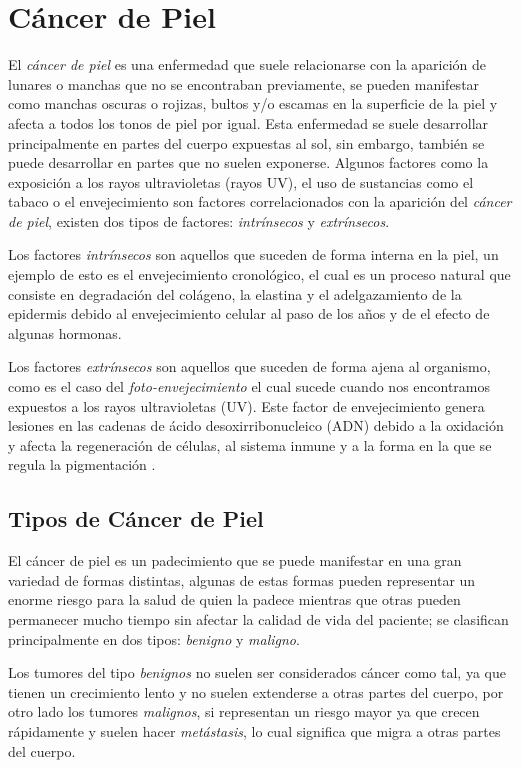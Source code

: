 \section{Cáncer de Piel}
El \emph{cáncer de piel} es una enfermedad que suele relacionarse con la aparición de lunares o manchas que no se encontraban previamente, se pueden manifestar como manchas oscuras o rojizas, bultos y/o escamas en la superficie de la piel y afecta a todos los tonos de piel por igual. Esta enfermedad se suele desarrollar principalmente en partes del cuerpo expuestas al sol, sin embargo, también se puede desarrollar en partes que no suelen exponerse. Algunos factores como la exposición a los rayos ultravioletas (rayos UV), el uso de sustancias como el tabaco o el envejecimiento son factores correlacionados con la aparición del \emph{cáncer de piel}, existen dos tipos de factores: \emph{intrínsecos} y \emph{extrínsecos}.

Los factores \emph{intrínsecos} son aquellos que suceden de forma interna en la piel, un ejemplo de esto es el envejecimiento cronológico, el cual es un proceso natural que consiste en degradación del colágeno, la elastina y el adelgazamiento de la epidermis debido al envejecimiento celular al paso de los años y de el efecto de algunas hormonas.
\bigskip

Los factores \emph{extrínsecos} son aquellos que suceden de forma ajena al organismo, como es el caso del \emph{foto-envejecimiento} el cual sucede cuando nos encontramos expuestos a los rayos ultravioletas (UV). Este factor de envejecimiento genera lesiones en las cadenas de ácido desoxirribonucleico (ADN) debido a la oxidación y afecta la regeneración de células, al sistema inmune y a la forma en la que se regula la pigmentación \citep{skin_aging}.

\subsection{Tipos de Cáncer de Piel}
El cáncer de piel es un padecimiento que se puede manifestar en una gran variedad de formas distintas, algunas de estas formas pueden representar un enorme riesgo para la salud de quien la padece mientras que otras pueden permanecer mucho tiempo sin afectar la calidad de vida del paciente; se clasifican principalmente en dos tipos: \emph{benigno} y \emph{maligno}.

Los tumores del tipo \emph{benignos} no suelen ser considerados cáncer como tal, ya que tienen un crecimiento lento y no suelen extenderse a otras partes del cuerpo, por otro lado los tumores \emph{malignos}, si representan un riesgo mayor ya que crecen rápidamente y suelen hacer \emph{metástasis}, lo cual significa que migra a otras partes del cuerpo.

